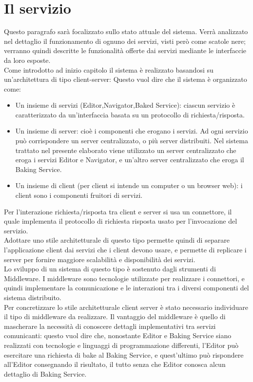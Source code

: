\section{Il servizio}
\label{sec:chapter_architettura_sistema_il_servizio}

Questo paragrafo sarà focalizzato sullo stato attuale del sistema. Verrà analizzato nel dettaglio il funzionamento di ognuno dei servizi, visti però come scatole nere; verranno quindi descritte le funzionalità offerte dai servizi mediante le interfaccie da loro esposte.
\\
Come introdotto ad inizio capitolo il sistema è realizzato basandosi su un’architettura di tipo client-server: Questo vuol dire che il sistema è organizzato come:
\begin{itemize}
\item Un insieme di servizi (Editor,Navigator,Baked Service): ciascun servizio è caratterizzato da un’interfaccia basata su un protocollo di richiesta/risposta.
\item Un insieme di server: cioè i componenti che erogano i servizi. Ad ogni servizio può corrispondere un server centralizzato, o più server distribuiti. Nel sistema trattato nel presente elaborato viene utilizzato un server centralizzato che eroga i servizi Editor e Navigator, e un’altro server centralizzato che eroga il Baking Service.
\item Un insieme di client (per client si intende un computer o un browser web): i client sono i componenti fruitori di servizi.
\end{itemize}
Per l’interazione richiesta/risposta tra client e server si usa un connettore, il quale implementa il protocollo di richiesta risposta usato per l’invocazione del servizio.
\\
Adottare uno stile architetturale di questo tipo permette quindi di separare l’applicazione client dai servizi che i client devono usare, e permette di replicare i server per fornire maggiore scalabilità e disponibilità dei servizi. 
\\
Lo sviluppo di un sistema di questo tipo è sostenuto dagli strumenti di Middleware. I middleware sono tecnologie utilizzate per realizzare i connettori, e quindi implementare la comunicazione e le interazioni tra i diversi componenti del sistema distribuito.
\\  
Per concretizzare lo stile architetturale client server è stato necessario individuare il tipo di middleware da realizzare. Il vantaggio del middleware è quello di mascherare la necessità di conoscere dettagli implementativi tra servizi comunicanti: questo vuol dire che, nonostante Editor e Baking Service siano realizzati con tecnologie e linguaggi di programmazione differenti, l’Editor può esercitare una richiesta di bake al Baking Service, e quest’ultimo può rispondere all’Editor consegnando il risultato, il tutto senza che Editor conosca alcun dettaglio di Baking Service. 

